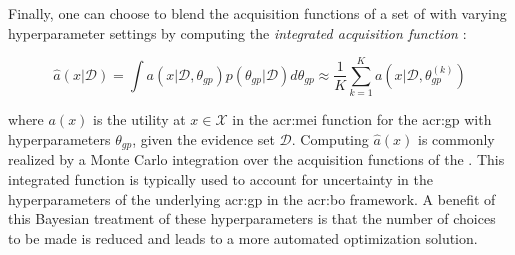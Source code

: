 Finally, one can choose to blend the acquisition functions of a set of  with varying hyperparameter settings by computing the \textit{integrated acquisition function} \cite{snoek2012practical}:

\begin{equation}
\label{eq:integrated-acq}
\hat{a}(x\vert\mathcal{D}) = \int a(x\vert\mathcal{D}, \theta_{\mathit{gp}})p(\theta_\mathit{gp}\vert\mathcal{D}) d\theta_{\mathit{gp}} \approx \frac{1}{K} \sum_{k=1}^K a(x\vert\mathcal{D}, \theta_{\mathit{gp}}^{(k)})
\end{equation}

\noindent where $a(x)$ is the utility at $x \in \mathcal{X}$ in the \acrshort{acr:mei} function for the \acrshort{acr:gp} with hyperparameters $\theta_\mathit{gp}$, given the evidence set $\mathcal{D}$.
Computing $\hat{a}(x)$ is commonly realized by a Monte Carlo integration over the acquisition functions of the .
This integrated function is typically used to account for uncertainty in the hyperparameters of the underlying \acrshort{acr:gp} in the \acrshort{acr:bo} framework.
A benefit of this Bayesian treatment of these hyperparameters is that the number of choices to be made is reduced and leads to a more automated optimization solution.





